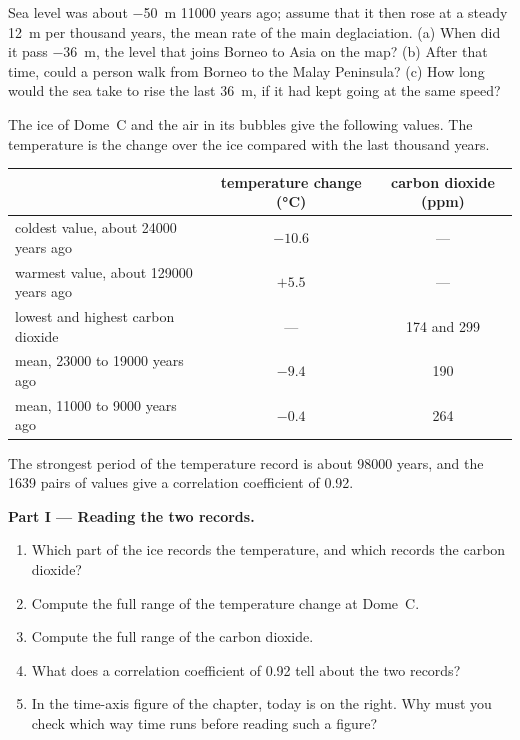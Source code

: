 \begin{exercise}[$\star\star\star$]\label{exo:g12:past-climates:15}
Sea level was about \qty{-50}{m} \num{11000} years ago; assume that it then
rose at a steady \qty{12}{m} per thousand years, the mean rate of the main
deglaciation. (a) When did it pass \qty{-36}{m}, the level that joins Borneo
to Asia on the map? (b) After that time, could a person walk from Borneo to
the Malay Peninsula? (c) How long would the sea take to rise the last
\qty{36}{m}, if it had kept going at the same speed?
\end{exercise}

\begin{problem}
\label{pb:g12:past-climates:1}
The ice of Dome~C and the air in its bubbles give the following values. The
temperature is the change over the ice compared with the last thousand years.

\begin{center}
\small
\begin{tabular}{|l|c|c|}
\hline
 & \textbf{temperature change (\unit{\degreeCelsius})} & \textbf{carbon dioxide (ppm)} \\
\hline
coldest value, about \num{24000} years ago & $-10.6$ & --- \\
warmest value, about \num{129000} years ago & $+5.5$ & --- \\
lowest and highest carbon dioxide & --- & 174 and 299 \\
mean, \num{23000} to \num{19000} years ago & $-9.4$ & 190 \\
mean, \num{11000} to \num{9000} years ago & $-0.4$ & 264 \\
\hline
\end{tabular}
\end{center}

The strongest period of the temperature record is about \num{98000} years,
and the 1639 pairs of values give a correlation coefficient of 0.92.

\medskip
\noindent\textbf{Part I --- Reading the two records.}
\begin{enumerate}
  \item Which part of the ice records the temperature, and which records the
        carbon dioxide?
  \item Compute the full range of the temperature change at Dome~C.
  \item Compute the full range of the carbon dioxide.
  \item What does a correlation coefficient of 0.92 tell about the two
        records?
  \item In the time-axis figure of the chapter, today is on the right. Why
        must you check which way time runs before reading such a figure?
\end{enumerate}


\end{problem}
